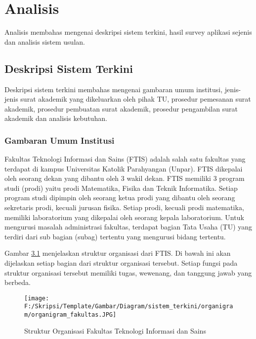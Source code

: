 \chapter{Analisis}
\label{chap:analisis}
Analisis membahas mengenai deskripsi sistem terkini, hasil survey aplikasi sejenis dan analisis sistem usulan.

\section{Deskripsi Sistem Terkini}
\label{sec:deskripsi_sistem_terkini}
Deskripsi sistem terkini membahas mengenai gambaran umum institusi, jenis-jenis surat akademik yang dikeluarkan oleh pihak TU, prosedur pemesanan surat akademik, prosedur pembuatan surat akademik, prosedur pengambilan surat akademik dan analisis kebutuhan. \\

\subsection{Gambaran Umum Institusi}
\label{sec:gambaran_umum_institusi}
Fakultas Teknologi Informasi dan Sains (FTIS) adalah salah satu fakultas yang terdapat di kampus Universitas Katolik Parahyangan (Unpar). FTIS dikepalai oleh seorang dekan yang dibantu oleh 3 wakil dekan. FTIS memiliki 3 program studi (prodi) yaitu prodi Matematika, Fisika dan Teknik Informatika. Setiap program studi dipimpin oleh seorang ketua prodi yang dibantu oleh seorang sekretaris prodi, kecuali jurusan fisika. Setiap prodi, kecuali prodi matematika, memiliki laboratorium yang dikepalai oleh seorang kepala laboratorium. Untuk mengurusi masalah administrasi fakultas, terdapat bagian Tata Usaha (TU) yang terdiri dari sub bagian (subag) tertentu yang mengurusi bidang tertentu.\

Gambar \hyperlink{organigram_fakultas}{3.1} menjelaskan struktur organisasi dari FTIS. Di bawah ini akan dijelaskan  setiap bagian dari struktur organisasi tersebut. Setiap fungsi pada struktur organisasi tersebut memiliki tugas, wewenang, dan tanggung jawab yang berbeda.
\begin{figure}[H]
	\centering
		\texttt{[image: F:/Skripsi/Template/Gambar/Diagram/sistem\_terkini/organigram/organigram\_fakultas.JPG]}
	\caption{Struktur Organisasi Fakultas Teknologi Informasi dan Sains}
	\label{fig:organigram_fakultas}
\end{figure}

